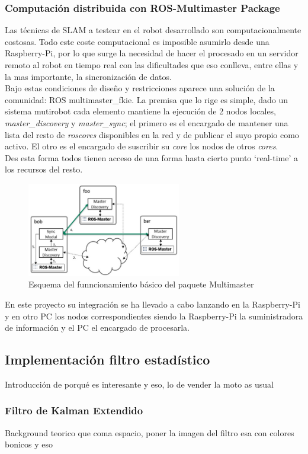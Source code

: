 \subsubsection{Computación distribuida con ROS-Multimaster Package}
Las técnicas de SLAM a testear en el robot desarrollado son computacionalmente costosas. Todo este coste computacional es
imposible asumirlo desde una Raspberry-Pi, por lo que surge la necesidad de hacer el procesado en un servidor remoto al robot en tiempo real con las 
dificultades que eso conlleva, entre ellas y la mas importante, la sincronización de datos.\\
Bajo estas condiciones de diseño y restricciones aparece una solución de la comunidad: ROS multimaster\_fkie. La premisa que lo rige es simple, dado un sistema mutirobot
cada elemento mantiene la ejecución de 2 nodos locales, \textit{master\_discovery} y \textit{master\_sync}; el primero es el encargado de mantener una lista del resto 
de \textit{roscores} disponibles en la red y de publicar el suyo propio como activo. El otro es el encargado de suscribir su \textit{core} los nodos de otros \textit{cores}.\\
Des esta forma todos tienen acceso de una forma hasta cierto punto `real-time' a los recursos del resto. 
\begin{figure}[!ht]
    \centering
    \includegraphics[width=0.6\textwidth]{images/ros_multimaster.png}
    \caption{Esquema del funncionamiento básico del paquete Multimaster}
\end{figure}
En este proyecto su integración se ha llevado a cabo lanzando en la Raspberry-Pi y en otro PC los nodos correspondientes siendo la Raspberry-Pi la 
suministradora de información y el PC el encargado de procesarla.
\subsection{Implementación filtro estadístico}
Introducción de porqué es interesante y eso, lo de vender la moto as usual
\subsubsection{Filtro de Kalman Extendido}
Background teorico que coma espacio, poner la imagen del filtro esa con colores bonicos y eso
